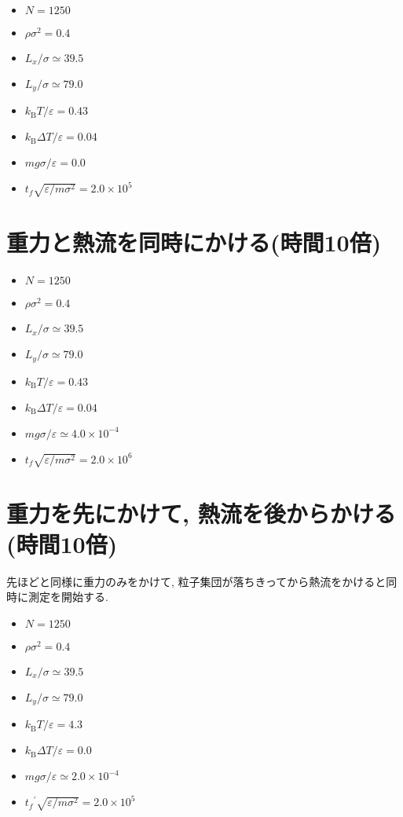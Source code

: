 \begin{itemize}
  \item $N = 1250$
  \item $\rho {\sigma}^2 = 0.4$
  \item $L_x / \sigma \simeq 39.5$
  \item $L_y / \sigma \simeq 79.0$
  \item $k_{\text{B}} T / \varepsilon = 0.43$
  \item $k_{\text{B}} \Delta T / \varepsilon = 0.04$
  \item $mg\sigma/\varepsilon = 0.0$
  \item $t_f \sqrt{\varepsilon / m \sigma^2} = 2.0 \times 10^{5}$
\end{itemize}



\section{重力と熱流を同時にかける(時間10倍)}\label{sec:RaRtmap10}

\begin{itemize}
  \item $N = 1250$
  \item $\rho {\sigma}^2 = 0.4$
  \item $L_x / \sigma \simeq 39.5$
  \item $L_y / \sigma \simeq 79.0$
  \item $k_{\text{B}} T / \varepsilon = 0.43$
  \item $k_{\text{B}} \Delta T / \varepsilon = 0.04$
  \item $mg\sigma/\varepsilon \simeq 4.0 \times 10^{-4}$
  \item $t_f \sqrt{\varepsilon / m \sigma^2} = 2.0 \times 10^{6}$
\end{itemize}



\section{重力を先にかけて, 熱流を後からかける(時間10倍)}\label{sec:RaRtmap10_drop}

先ほどと同様に重力のみをかけて, 粒子集団が落ちきってから熱流をかけると同時に測定を開始する.

\begin{itemize}
  \item $N = 1250$
  \item $\rho \sigma^2 = 0.4$
  \item $L_x / \sigma \simeq 39.5$
  \item $L_y / \sigma \simeq 79.0$
  \item $k_{\text{B}} T/\varepsilon = 4.3$
  \item $k_{\text{B}} \Delta T/\varepsilon = 0.0$
  \item $mg\sigma/\varepsilon \simeq 2.0 \times 10^{-4}$
  \item ${t_f}^{\prime} \sqrt{\varepsilon / m \sigma^2} = 2.0 \times 10^{5}$
\end{itemize}

